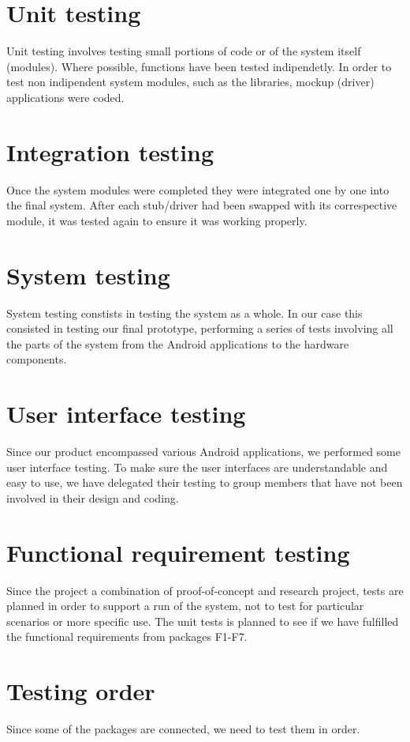 \section{Unit testing}
Unit testing involves testing small portions of code or of the system itself
(modules). Where possible, functions have been tested indipendetly. In order to
test non indipendent system modules, such as the libraries, mockup (driver)
applications were coded.

\section{Integration testing}
Once the system modules were completed they were integrated one by one into the
final system. After each stub/driver had been swapped with its correspective
module, it was tested again to ensure it was working properly.

\section{System testing}
System testing constists in testing the system as a whole.
In our case this consisted in testing our final prototype, performing a series
of tests involving all the parts of the system from the Android applications
to the hardware components.

\section{User interface testing}
Since our product encompassed various Android applications, we performed some
user interface testing. To make sure the user interfaces are understandable and
easy to use, we have delegated their testing to group members that have not been
involved in their design and coding.

\section{Functional requirement testing}
Since the project a combination of proof-of-concept and research project,
tests are planned in order to support a run of the system, not to test for
particular scenarios or more specific use. The unit tests is planned to see if
we have fulfilled the functional requirements from packages F1-F7.

\section{Testing order}
Since some of the packages are connected, we need to test them in order.

